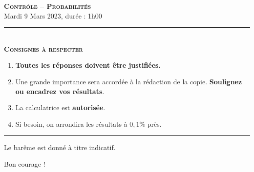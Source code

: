 \documentclass[11pt]{article}
\begin{document}

%
%
%

\begin{center}
\textbf{\LARGE \textsc{Contrôle -- Probabilités}}\\[2mm]

{\large Mardi 9 Mars 2023, durée : 1h00}\\[1mm]
\noindent\rule{8cm}{0.4pt}\\[1mm]
\textbf{\textsc{Consignes à respecter}}
\begin{enumerate}[label=\textbf{\arabic*/}]
\item \textbf{Toutes les réponses doivent être justifiées.}
\item Une grande importance sera accordée à la rédaction de la
  copie. \textbf{Soulignez ou encadrez vos résultats}.
\item La calculatrice est \textbf{autorisée}.
\item Si besoin, on arrondira les résultats à $0,1$\% près.
    \end{enumerate}
\noindent\rule{12cm}{0.4pt}
\end{center}

\vspace{2mm}
\noindent Le barême est donné à titre indicatif.
\vspace{2mm}
\begin{center}
  Bon courage !
\end{center}
\end{document}
